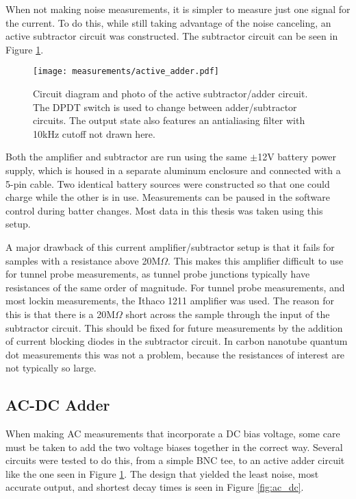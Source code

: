When not making noise measurements, it is simpler to measure just one signal for the current. To do this, while still taking advantage of the noise canceling, an active subtractor circuit was constructed. The subtractor circuit can be seen in Figure \ref{fig:subtractor}. 

\begin{figure}
    \centering
    \texttt{[image: measurements/active\_adder.pdf]}
    \caption{Circuit diagram and photo of the active subtractor/adder circuit. The DPDT switch is used to change between adder/subtractor circuits. The output state also features an antialiasing filter with 10kHz cutoff not drawn here.}
    \label{fig:subtractor}
\end{figure}

Both the amplifier and subtractor are run using the same $\pm$12V battery power supply, which is housed in a separate aluminum enclosure and connected with a 5-pin cable. Two identical battery sources were constructed so that one could charge while the other is in use. Measurements can be paused in the software control during batter changes. Most data in this thesis was taken using this setup.

A major drawback of this current amplifier/subtractor setup is that it fails for samples with a resistance above 20M$\Omega$. This makes this amplifier difficult to use for tunnel probe measurements, as tunnel probe junctions typically have resistances of the same order of magnitude. For tunnel probe measurements, and most lockin measurements, the Ithaco 1211 amplifier was used. The reason for this is that there is a 20M$\Omega$ short across the sample through the input of the subtractor circuit. This should be fixed for future measurements by the addition of current blocking diodes in the subtractor circuit. In carbon nanotube quantum dot measurements this was not a problem, because the resistances of interest are not typically so large. 

\subsection{AC-DC Adder}
\label{sec:adder}

When making AC measurements that incorporate a DC bias voltage, some care must be taken to add the two voltage biases together in the correct way. Several circuits were tested to do this, from a simple BNC tee, to an active adder circuit like the one seen in Figure \ref{fig:subtractor}. The design that yielded the least noise, most accurate output, and shortest decay times is seen in Figure \ref{fig:ac_dc}.

